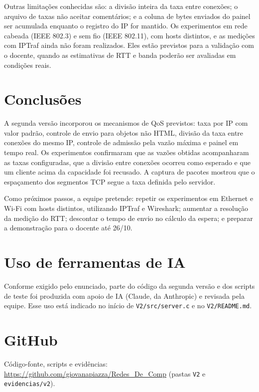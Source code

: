 \documentclass[12pt,a4paper]{article}
\begin{document}
Outras limitações conhecidas são: a divisão inteira da taxa entre conexões; o arquivo de
taxas não aceitar comentários; e a coluna de bytes enviados do painel ser acumulada
enquanto o registro do IP for mantido. Os experimentos em rede cabeada (IEEE 802.3) e sem
fio (IEEE 802.11), com hosts distintos, e as medições com IPTraf ainda não foram
realizados. Eles estão previstos para a validação com o docente, quando as estimativas de
RTT e banda poderão ser avaliadas em condições reais.

\section{Conclusões}

A segunda versão incorporou os mecanismos de QoS previstos: taxa por IP com valor padrão,
controle de envio para objetos não HTML, divisão da taxa entre conexões do mesmo IP,
controle de admissão pela vazão máxima e painel em tempo real. Os experimentos confirmaram
que as vazões obtidas acompanharam as taxas configuradas, que a divisão entre conexões
ocorreu como esperado e que um cliente acima da capacidade foi recusado. A captura de
pacotes mostrou que o espaçamento dos segmentos TCP segue a taxa definida pelo servidor.

Como próximos passos, a equipe pretende: repetir os experimentos em Ethernet e Wi-Fi com
hosts distintos, utilizando IPTraf e Wireshark; aumentar a resolução da medição do RTT;
descontar o tempo de envio no cálculo da espera; e preparar a demonstração para o docente
até 26/10.

\section{Uso de ferramentas de IA}

Conforme exigido pelo enunciado, parte do código da segunda versão e dos scripts de teste
foi produzida com apoio de IA (Claude, da Anthropic) e revisada pela equipe. Esse uso está
indicado no início de \texttt{V2/src/server.c} e no \texttt{V2/README.md}.

\section{GitHub}

Código-fonte, scripts e evidências:
\url{https://github.com/giovanapiazza/Redes_De_Comp} (pastas \texttt{V2} e
\texttt{evidencias/v2}).
\end{document}
